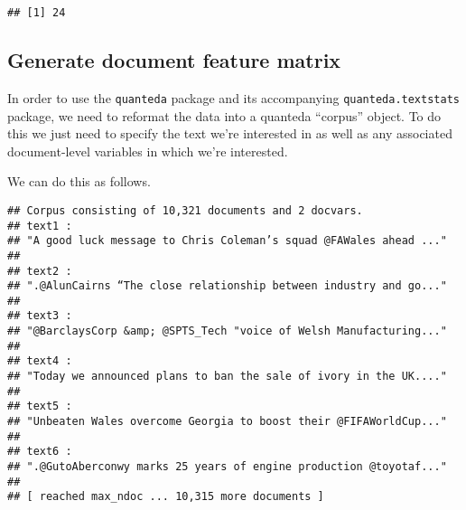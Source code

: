 \documentclass[
]{article}
\newenvironment{Shaded}{\begin{snugshade}}{\end{snugshade}}
\newcommand{\AttributeTok}[1]{\textcolor[rgb]{0.13,0.29,0.53}{#1}}
\newcommand{\CommentTok}[1]{\textcolor[rgb]{0.56,0.35,0.01}{\textit{#1}}}
\newcommand{\FunctionTok}[1]{\textcolor[rgb]{0.13,0.29,0.53}{\textbf{#1}}}
\newcommand{\NormalTok}[1]{#1}
\newcommand{\OtherTok}[1]{\textcolor[rgb]{0.56,0.35,0.01}{#1}}
\newcommand{\SpecialCharTok}[1]{\textcolor[rgb]{0.81,0.36,0.00}{\textbf{#1}}}
\newcommand{\StringTok}[1]{\textcolor[rgb]{0.31,0.60,0.02}{#1}}
\begin{document}
\begin{Shaded}
\end{Shaded}

\begin{verbatim}
## [1] 24
\end{verbatim}

\subsection{Generate document feature
matrix}\label{generate-document-feature-matrix}

In order to use the \texttt{quanteda} package and its accompanying
\texttt{quanteda.textstats} package, we need to reformat the data into a
quanteda ``corpus'' object. To do this we just need to specify the text
we're interested in as well as any associated document-level variables
in which we're interested.

We can do this as follows.

\begin{Shaded}
\end{Shaded}

\begin{verbatim}
## Corpus consisting of 10,321 documents and 2 docvars.
## text1 :
## "A good luck message to Chris Coleman’s squad @FAWales ahead ..."
## 
## text2 :
## ".@AlunCairns “The close relationship between industry and go..."
## 
## text3 :
## "@BarclaysCorp &amp; @SPTS_Tech "voice of Welsh Manufacturing..."
## 
## text4 :
## "Today we announced plans to ban the sale of ivory in the UK...."
## 
## text5 :
## "Unbeaten Wales overcome Georgia to boost their @FIFAWorldCup..."
## 
## text6 :
## ".@GutoAberconwy marks 25 years of engine production @toyotaf..."
## 
## [ reached max_ndoc ... 10,315 more documents ]
\end{verbatim}
\end{document}
